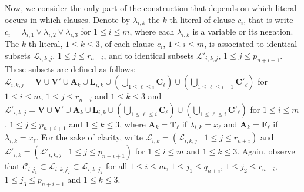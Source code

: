 \documentclass[a4paper,10pt]{llncs}
\begin{document}
Now, we consider the only part of the construction that depends on which 
literal occurs in which clauses. Denote by $\lambda_{i, k}$ the $k$-th literal 
of clause $c_i$, 
that is write $c_i = \lambda_{i, 1} \vee \lambda_{i, 2} \vee \lambda_{i, 3}$ 
for $1 \leq i \leq m$,
where each $\lambda_{i, k}$ is a variable or its negation. 
The $k$-th literal, $1 \leq k \leq 3$, of each clause $c_i$, $1 \leq i \leq m$, 
is associated to identical subsets $\mathcal{L}_{i, k, j}$, $1 \leq j \leq r_{n+i}$, 
and to identical subsets $\mathcal{L}'_{i, k, j}$, $1 \leq j \leq p_{n+i+1}$. 
These subsets are defined as follows:
$\mathcal{L}_{i, k, j} = \mathbf{V} \cup \mathbf{V}' \cup 
\mathbf{A}_k \cup \mathbf{L}_{i, k} \cup 
\left( \bigcup_{1 \leq \ell \leq i} \mathbf{C}_\ell \right) \cup 
\left( \bigcup_{1 \leq \ell \leq i-1} \mathbf{C}'_\ell \right)$
for $1 \leq i \leq m$, $1 \leq j \leq r_{n+i}$ and $1 \leq k \leq 3$ and
$\mathcal{L}'_{i, k, j} = \mathbf{V} \cup \mathbf{V}' \cup \mathbf{A}_k 
\cup \mathbf{L}_{i, k} \cup \left( \bigcup_{1 \leq \ell \leq i} \mathbf{C}_\ell \right) 
\cup \left( \bigcup_{1 \leq \ell \leq i} \mathbf{C}'_\ell \right)$ 
for $1 \leq i \leq m$, $1 \leq j \leq p_{n+i+1}$ and $1 \leq k \leq 3$, 
where $\mathbf{A}_k = \mathbf{T}_\ell$ if $\lambda_{i, k} = x_\ell$ 
and $\mathbf{A}_k = \mathbf{F}_\ell$ if $\lambda_{i, k} = \overline{x}_\ell$. 
For the sake of clarity, write 
$\mathcal{L}_{i, k} = (\mathcal{L}_{i, k, j} \mid 1 \leq j \leq r_{n+i})$ and 
$\mathcal{L}'_{i, k} = (\mathcal{L}'_{i, k, j} \mid 1 \leq j \leq p_{n+i+1})$ 
for $1 \leq i \leq m$ and $1 \leq k \leq 3$. 
Again, observe that 
$\mathcal{C}_{i, j_1} \subset \mathcal{L}_{i, k, j_2} \subset \mathcal{L}_{i, k, j_2}$ 
for all $1 \leq i \leq m$, $1 \leq j_1 \leq q_{n+i}$, $1 \leq j_2 \leq r_{n+i}$, 
$1 \leq j_3 \leq p_{n+i+1}$ and $1 \leq k \leq 3$.
\end{document}
